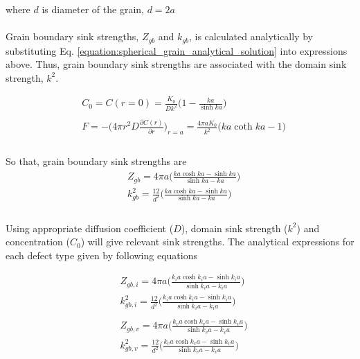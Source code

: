 \documentclass[a4paper]{article}
\begin{document}
    where ${d}$ is diameter of the grain, ${d=2a}$\\\\
    Grain boundary sink strengths, ${Z_{gb}}$ and ${k_{gb}}$, is calculated analytically by substituting Eq.  \ref{equation:spherical_grain_analytical_solution} into expressions above. Thus, grain boundary sink strengths are associated with the domain sink strength, ${k^2}$.\cite{heald1977}

    \begin{equation}
      \begin{aligned}
        &C_0=C(r=0)=\frac{K_0}{Dk^2}\bigg(1-\frac{ka}{\sinh{ka}}\bigg)\\\\
        &F=-\bigg(4\pi r^2D\frac{\partial C(r)}{\partial r}\bigg)_{r=a}=\frac{4\pi aK_0}{k^2}\bigg(ka\coth{ka}-1\bigg)\\
      \end{aligned}
    \end{equation}\\
    So that, grain boundary sink strengths are
    \begin{equation}
      \begin{aligned}
        &Z_{gb}=4\pi a\bigg(\frac{ka\cosh ka-\sinh ka}{\sinh ka-ka}\bigg)\\
        &k^2_{gb}=\frac{12}{d^2}\bigg(\frac{ka\cosh ka-\sinh ka}{\sinh ka-ka}\bigg)\\
      \end{aligned}
    \end{equation}\\

    Using appropriate diffusion coefficient (${D}$), domain sink strength (${k^2}$) and concentration (${C_0}$) will give  relevant sink strengths. The analytical expressions for each defect type given by following equations

    \begin{equation}
      \begin{aligned}
        &Z_{gb,i}=4\pi a\bigg(\frac{k_ia\cosh k_ia-\sinh k_ia}{\sinh k_ia-k_ia}\bigg)\\
        &k^2_{gb,i}=\frac{12}{d^2}\bigg(\frac{k_ia\cosh k_ia-\sinh k_ia}{\sinh k_ia-k_ia}\bigg)\\\\
        &Z_{gb,v}=4\pi a\bigg(\frac{k_va\cosh k_va-\sinh k_va}{\sinh k_va-k_va}\bigg)\\
        &k^2_{gb,v}=\frac{12}{d^2}\bigg(\frac{k_va\cosh k_va-\sinh k_va}{\sinh k_va-k_va}\bigg)\\
      \end{aligned}
    \end{equation}\\
\end{document}
